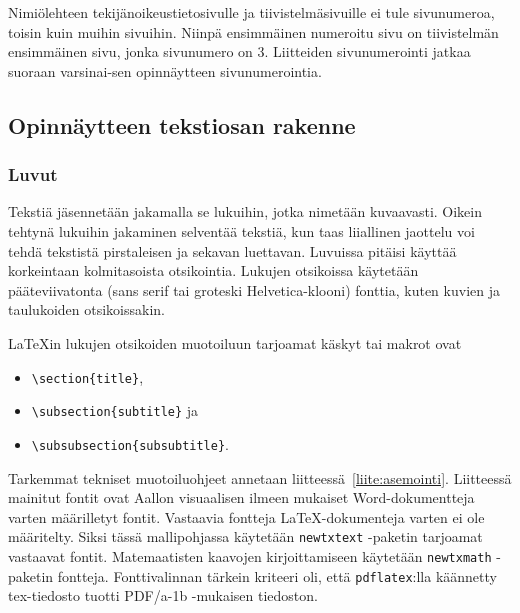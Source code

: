 \documentclass[finnish, 12pt, a4paper, arts, utf8, a-2b, online]{aaltothesis}
\begin{document}
Nimiölehteen tekijänoikeustietosivulle ja tiivistelmäsivuille ei tule 
sivunumeroa, toisin kuin muihin sivuihin. Niinpä ensimmäinen numeroitu sivu on 
tiivistelmän ensimmäinen sivu, jonka sivunumero on 3. Liitteiden sivunumerointi 
jatkaa suoraan varsinai-sen opinnäytteen sivunumerointia.


\subsection{Opinnäytteen tekstiosan rakenne}
\subsubsection{Luvut}

Tekstiä jäsennetään jakamalla se lukuihin, jotka nimetään kuvaavasti. Oikein 
tehtynä lukuihin jakaminen selventää tekstiä, kun taas liiallinen jaottelu voi 
tehdä tekstistä pirstaleisen ja sekavan luettavan. Luvuissa pitäisi käyttää 
korkeintaan kolmitasoista otsikointia. Lukujen otsikoissa käytetään 
pääteviivatonta (sans serif tai groteski Helvetica-klooni) fonttia, kuten 
kuvien ja taulukoiden otsikoissakin.

\LaTeX{}in lukujen otsikoiden muotoiluun tarjoamat käskyt tai makrot ovat 
\begin{itemize}
	\setlength{\itemsep}{0pt}
	\item[] \verb+\section{title}+,
	\item[] \verb+\subsection{subtitle}+ ja
	\item[] \verb+\subsubsection{subsubtitle}+.
\end{itemize}

Tarkemmat tekniset muotoiluohjeet annetaan liitteessä~\ref{liite:asemointi}. 
Liitteessä mainitut fontit ovat Aallon visuaalisen ilmeen mukaiset 
Word-dokumentteja varten määrilletyt fontit. Vastaavia fontteja 
\LaTeX{}-dokumenteja varten ei ole määritelty. Siksi tässä mallipohjassa 
käytetään \verb+newtxtext+ -paketin tarjoamat vastaavat fontit. Matemaatisten 
kaavojen kirjoittamiseen käytetään \verb+newtxmath+ -paketin fontteja. 
Fonttivalinnan tärkein kriteeri oli, että \texttt{pdflatex}:lla käännetty 
tex-tiedosto tuotti PDF/a-1b -mukaisen tiedoston.
\end{document}

